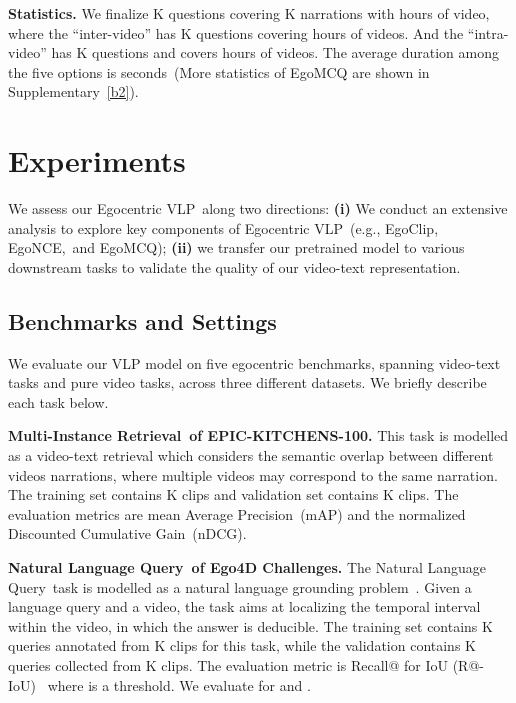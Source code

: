 \documentclass{article}
\newcommand{\vlp}{Egocentric VLP}
\newcommand{\dataset}{EgoClip}
\newcommand{\model}{EgoNCE\xspace}
\newcommand{\eval}{EgoMCQ}
\newcommand{\epic}{EPIC-KITCHENS-100}
\newcommand{\mir}{Multi-Instance Retrieval}
\newcommand{\nlq}{Natural Language Query}
\begin{document}
\textbf{Statistics.}
We finalize K questions covering K narrations with  hours of video, where the ``inter-video'' has K questions covering  hours of videos. And the ``intra-video'' has K questions and covers  hours of videos. The average duration among the five options is  seconds~(More statistics of EgoMCQ are shown in Supplementary~\ref{b2}). \section{Experiments}
We assess our \vlp~along two directions:
\textbf{(i)} We conduct an extensive analysis to explore key components of \vlp~(e.g., \dataset, \model,~and \eval);
\textbf{(ii)} we transfer our pretrained model to various downstream tasks to validate the quality of our video-text representation.

\begin{comment}
\begin{table}[h]
	\centering
	\scriptsize
	\begin{threeparttable}
		\begin{tabular}{lcccclc}
			\toprule[1pt] 
			\textbf{Benchmarks} &  \textbf{Tasks} & \textbf{V-L or V} & \textbf{Datasets} &   \textbf{\# Train} & \textbf{Train~/~FT Data} & \textbf{mAP~(\%)}  \\ \midrule[1pt] 
			\bottomrule[1pt] 
		\end{tabular}
	\end{threeparttable}
	\label{dataset}
	\caption{Performance of the Charades-Ego dataset (1st-person test set).}
\end{table}
\end{comment}

\subsection{Benchmarks and Settings}\label{e1}
We evaluate our VLP model on five egocentric benchmarks, spanning video-text tasks and pure video tasks, across three different datasets. We briefly describe each task below.

\textbf{\mir~of \epic.} 
This task is modelled as a video-text retrieval which considers the semantic overlap between different videos narrations, where multiple videos may correspond to the same narration. 
The training set contains K clips and validation set contains K clips. 
The evaluation metrics are mean Average Precision~(mAP) and the normalized Discounted Cumulative Gain~(nDCG).

\textbf{\nlq~of Ego4D Challenges.} 
The \nlq~task is modelled as a natural language grounding problem~\cite{hendricks2018localizing,Gao_2017_ICCV,soldan2021vlg}. 
Given a language query and a video, the task aims at localizing the temporal interval within the video, in which the answer is deducible. 
The training set contains K queries annotated from K clips for this task, while the validation contains K queries collected from K clips. 
The evaluation metric is Recall@ for IoU (R@-IoU)~\cite{hendricks2018localizing} where  is a threshold.
We evaluate for  and .
\end{document}
